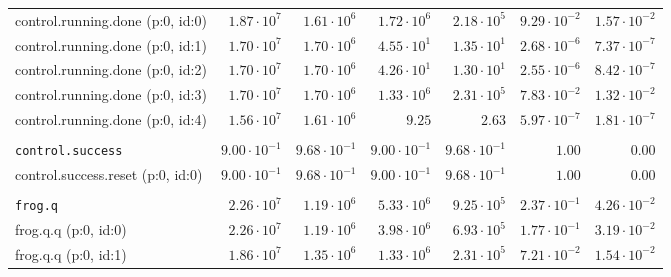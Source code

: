 \begin{table}[htbp]
{\begin{tabular}{lrrrrrr}
\hspace{3mm}control.running.done (p:0, id:0)  &  $1.87 \cdot 10^{7}$ &  $1.61 \cdot 10^{6}$ &  $1.72 \cdot 10^{6}$ &  $2.18 \cdot 10^{5}$ & $9.29 \cdot 10^{-2}$ & $1.57 \cdot 10^{-2}$ \\
\hspace{3mm}control.running.done (p:0, id:1)  &  $1.70 \cdot 10^{7}$ &  $1.70 \cdot 10^{6}$ &  $4.55 \cdot 10^{1}$ &  $1.35 \cdot 10^{1}$ & $2.68 \cdot 10^{-6}$ & $7.37 \cdot 10^{-7}$ \\
\hspace{3mm}control.running.done (p:0, id:2)  &  $1.70 \cdot 10^{7}$ &  $1.70 \cdot 10^{6}$ &  $4.26 \cdot 10^{1}$ &  $1.30 \cdot 10^{1}$ & $2.55 \cdot 10^{-6}$ & $8.42 \cdot 10^{-7}$ \\
\hspace{3mm}control.running.done (p:0, id:3)  &  $1.70 \cdot 10^{7}$ &  $1.70 \cdot 10^{6}$ &  $1.33 \cdot 10^{6}$ &  $2.31 \cdot 10^{5}$ & $7.83 \cdot 10^{-2}$ & $1.32 \cdot 10^{-2}$ \\
\hspace{3mm}control.running.done (p:0, id:4)  &  $1.56 \cdot 10^{7}$ &  $1.61 \cdot 10^{6}$ &               $9.25$ &               $2.63$ & $5.97 \cdot 10^{-7}$ & $1.81 \cdot 10^{-7}$ \\
\\[-8pt]\texttt{control.success}              & $9.00 \cdot 10^{-1}$ & $9.68 \cdot 10^{-1}$ & $9.00 \cdot 10^{-1}$ & $9.68 \cdot 10^{-1}$ &               $1.00$ &               $0.00$ \\
\hspace{3mm}control.success.reset (p:0, id:0) & $9.00 \cdot 10^{-1}$ & $9.68 \cdot 10^{-1}$ & $9.00 \cdot 10^{-1}$ & $9.68 \cdot 10^{-1}$ &               $1.00$ &               $0.00$ \\
\\[-8pt]\texttt{frog.q}                       &  $2.26 \cdot 10^{7}$ &  $1.19 \cdot 10^{6}$ &  $5.33 \cdot 10^{6}$ &  $9.25 \cdot 10^{5}$ & $2.37 \cdot 10^{-1}$ & $4.26 \cdot 10^{-2}$ \\
\hspace{3mm}frog.q.q (p:0, id:0)              &  $2.26 \cdot 10^{7}$ &  $1.19 \cdot 10^{6}$ &  $3.98 \cdot 10^{6}$ &  $6.93 \cdot 10^{5}$ & $1.77 \cdot 10^{-1}$ & $3.19 \cdot 10^{-2}$ \\
\hspace{3mm}frog.q.q (p:0, id:1)              &  $1.86 \cdot 10^{7}$ &  $1.35 \cdot 10^{6}$ &  $1.33 \cdot 10^{6}$ &  $2.31 \cdot 10^{5}$ & $7.21 \cdot 10^{-2}$ & $1.54 \cdot 10^{-2}$ \\

\end{tabular}}
\end{table}
